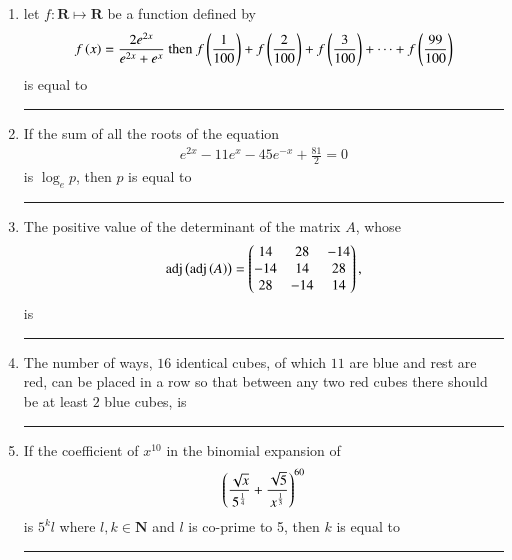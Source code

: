 \documentclass[journal]{IEEEtran}
\numberwithin{equation}{enumi}
\numberwithin{figure}{enumi}
\begin{document}
\begin{enumerate}

    \item 
    let $f: \mathbf{R} \mapsto \mathbf{R}$ be a function defined by 
    \begin{align*}
        f\left(x\right) = \frac{2e^{2x}}{e^{2x} + e^{x}}
        \text{ then }
        f\left(\frac{1}{100}\right) + f\left(\frac{2}{100}\right) + f\left(\frac{3}{100}\right) + \dots + f\left(\frac{99}{100}\right)
    \end{align*}
    is equal to \rule{1cm}{0.1pt}

    \hfill{}

    \item
    If the sum of all the roots of the equation 
    \begin{align*}
        e^{2x} - 11e^x - 45e^{-x} +\frac{81}{2}=0
    \end{align*}
    is $\log_e p$, then $p$ is equal to \rule{1cm}{0.1pt}

    \hfill{}

    \item 
    The positive value of the determinant of the matrix $A$, whose
    \begin{align*}
        \text{adj}\left(\text{adj}\left(A\right)\right) = \begin{pmatrix}14 & 28 & -14 \\ -14 & 14 & 28 \\ 28 & -14 & 14\end{pmatrix},
    \end{align*}
    is \rule{1cm}{0.1pt}

    \hfill{}

    \item 
    The number of ways, $16$ identical cubes, of which $11$ are blue and rest are red, can be placed in a row so that between any two red cubes there should be at least $2$ blue cubes, is \rule{1cm}{0.1pt}

    \hfill{}

    \item 
    If the coefficient of $x^{10}$ in the binomial expansion of 
    \begin{align*}
        \left(\frac{\sqrt{x}}{5^{\frac{1}{4}}} + \frac{\sqrt{5}}{x^{\frac{1}{3}}}\right)^{60}
    \end{align*}
    is $5^kl$ where $l,k \in \mathbf{N}$ and $l$ is co-prime to 5, then $k$ is equal to \rule{1cm}{0.1pt}


\end{enumerate}
\end{document}
